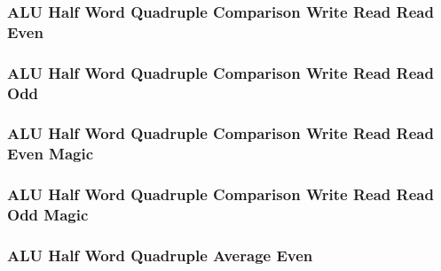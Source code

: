 

\subsubsection[{\small ALU Half Word Quadruple Comparison Write Read Read Even}]{ALU Half Word Quadruple Comparison Write Read Read Even} \label{sec:format-ALU-HQCWRRE}



\subsubsection[{\small ALU Half Word Quadruple Comparison Write Read Read Odd}]{ALU Half Word Quadruple Comparison Write Read Read Odd} \label{sec:format-ALU-HQCWRRO}



\subsubsection[{\small ALU Half Word Quadruple Comparison Write Read Read Even Magic}]{ALU Half Word Quadruple Comparison Write Read Read Even Magic} \label{sec:format-ALU-HQCWRRE.M}



\subsubsection[{\small ALU Half Word Quadruple Comparison Write Read Read Odd Magic}]{ALU Half Word Quadruple Comparison Write Read Read Odd Magic} \label{sec:format-ALU-HQCWRRO.M}



\subsubsection[{\small ALU Half Word Quadruple Average Even}]{ALU Half Word Quadruple Average Even} \label{sec:format-ALU-HQAVGE}

